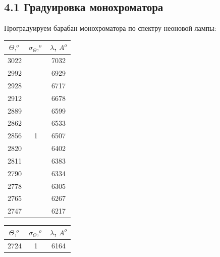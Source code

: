 \documentclass[a4paper,12pt]{report}
\begin{document}
\subsection*{4.1 Градуировка монохроматора}
Проградуируем барабан монохроматора по спектру неоновой лампы:
\begin{table}[H]
\begin{tabular}{|c|c|c|}
\hline
$\Theta, ^{o}$ & $\sigma_{\Theta}, ^{o}$     & $\lambda$, $A^{o}$ \\ \hline
3022     & \multirow{13}{*}{1} & 7032                         \\ \cline{1-1} \cline{3-3} 
2992     &                     & 6929                         \\ \cline{1-1} \cline{3-3} 
2928     &                     & 6717                         \\ \cline{1-1} \cline{3-3} 
2912     &                     & 6678                         \\ \cline{1-1} \cline{3-3} 
2889     &                     & 6599                         \\ \cline{1-1} \cline{3-3} 
2862     &                     & 6533                         \\ \cline{1-1} \cline{3-3} 
2856     &                     & 6507                         \\ \cline{1-1} \cline{3-3} 
2820     &                     & 6402                         \\ \cline{1-1} \cline{3-3} 
2811     &                     & 6383                         \\ \cline{1-1} \cline{3-3} 
2790     &                     & 6334                         \\ \cline{1-1} \cline{3-3} 
2778     &                     & 6305                         \\ \cline{1-1} \cline{3-3} 
2765     &                     & 6267                         \\ \cline{1-1} \cline{3-3} 
2747     &                     & 6217                         \\ \hline
\end{tabular}
\hspace{1.5 cm}
\begin{tabular}{|c|c|c|}
\hline
$\Theta, ^{o}$ & $\sigma_{\Theta}, ^{o}$     & $\lambda$, $A^{o}$  \\ \hline
2724     & \multirow{12}{*}{1} & 6164                         \\ \cline{1-1} \cline{3-3} 

\end{tabular}
\end{table}
\end{document}

